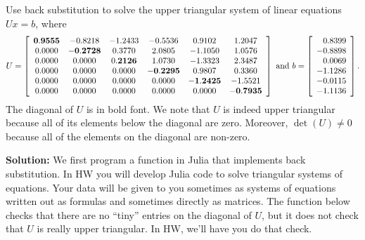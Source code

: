 \begin{example} Use back substitution to solve the upper triangular system of linear equations $U x = b$, where
$$U= \left[
\begin{array}{cccccc}
\bf 0.9555 & -0.8218 & -1.2433 & -0.5536 & 0.9102 & 1.2047 \\
0.0000 & \bf -0.2728 & 0.3770 & 2.0805 & -1.1050 & 1.0576 \\
0.0000 & 0.0000 & 0.\bf 2126 & 1.0730 & -1.3323 & 2.3487 \\
0.0000 & 0.0000 & 0.0000 &\bf -0.2295 & 0.9807 & 0.3360 \\
0.0000 & 0.0000 & 0.0000 & 0.0000 &\bf -1.2425 & -1.5521 \\
0.0000 & 0.0000 & 0.0000 & 0.0000 & 0.0000 &\bf -0.7935 \\
\end{array}
\right] \text{ and } b=\left[
\begin{array}{r}
0.8399 \\
-0.8898 \\
0.0069 \\
-1.1286 \\
-0.0115 \\
-1.1136 \\
\end{array}
\right]. $$
The diagonal of $U$ is in bold font. We note that $U$ is indeed upper triangular because all of its elements below the diagonal are zero. Moreover, $\det(U) \neq 0$  because all of the elements on the diagonal are non-zero. 
\end{example}

\textbf{Solution:}
We first program a function in Julia that implements back substitution.  In HW you will develop Julia code to solve triangular systems of equations. Your data will be given to you sometimes as systems of equations written out as formulas and sometimes directly as matrices. The function below checks that there are no ``tiny'' entries on the diagonal of $U$, but it does not check that $U$ is really upper triangular. In HW, we'll have you do that check.\\

